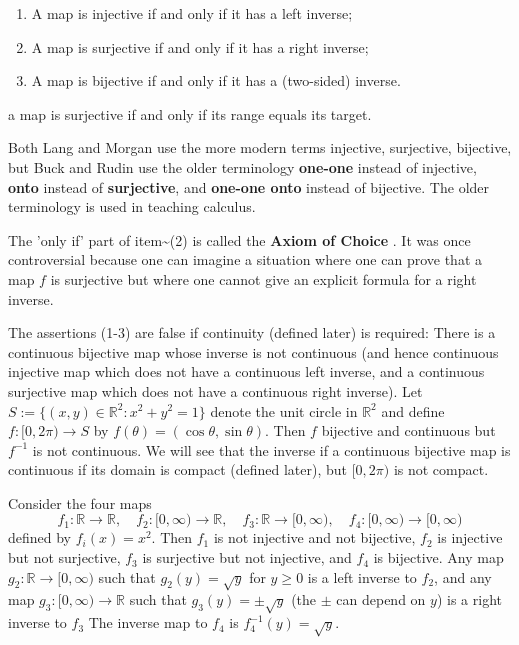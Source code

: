 \documentclass[10pt,a4paper,UTF8]{article}
\begin{document}
\begin{enumerate}
\item A map is injective if and only if it has a left inverse;
\item A map is surjective if and only if it has a right inverse;
\item A map is bijective  if and only if it has a (two-sided)  inverse.
\end{enumerate}

a map is surjective if and only if its range equals its target.

 Both Lang and Morgan use the more modern terms injective, surjective, bijective,
but Buck and Rudin use the older terminology
\textbf{one-one}  instead of injective,
\textbf{onto}  instead of \textbf{surjective}, and
\textbf{one-one onto}  instead of bijective.
The older terminology is used in teaching calculus.

The 'only if' part of item\textasciitilde{}(2) is called the \textbf{Axiom of Choice} .
It was once controversial because one can imagine a situation where
one can prove that a map \(f\) is surjective but where one cannot give
an explicit formula for a right inverse.


The assertions (1-3)  are false if continuity (defined later) is required:
There is a continuous bijective  map whose inverse is not continuous
(and hence continuous injective map which does not have a continuous left inverse,
and a continuous surjective map which does not have a continuous right inverse).
Let \(S:=\{(x,y)\in\mathbb{R}^2: x^2+y^2=1\}\) denote the unit circle in \(\mathbb{R}^2\)
and define \(f:[0,2\pi)\to S\) by \(f(\theta)=(\cos\theta,\sin\theta)\).
Then \(f\) bijective and continuous but \(f^{-1}\) is not continuous.
We will see that the inverse if a
continuous  bijective map is continuous if its domain is compact (defined later),
but \([0,2\pi)\) is not compact.


Consider the four maps
$$
f_1:\mathbb{R}\to\mathbb{R},\quad f_2:[0,\infty)\to\mathbb{R}, \quad f_3:\mathbb{R}\to[0,\infty), \quad f_4:[0,\infty)\to [0,\infty)
$$
defined by \(f_i(x)=x^2\). Then \(f_1\) is not injective and not bijective, \(f_2\) is injective but not surjective,
\(f_3\) is surjective but not injective, and \(f_4\) is bijective. Any map \(g_2:\mathbb{R}\to[0,\infty)\)
such that \(g_2(y)=\sqrt{y}\) for \(y\ge 0\) is a left inverse to \(f_2\), and any map \(g_3:[0,\infty)\to\mathbb{R}\)
such that \(g_3(y)=\pm\sqrt{y}\) (the \(\pm\) can depend on \(y\)) is a right inverse to \(f_3\)
The inverse map to \(f_4\) is \(f_4^{-1}(y)=\sqrt{y}\).
\end{document}
